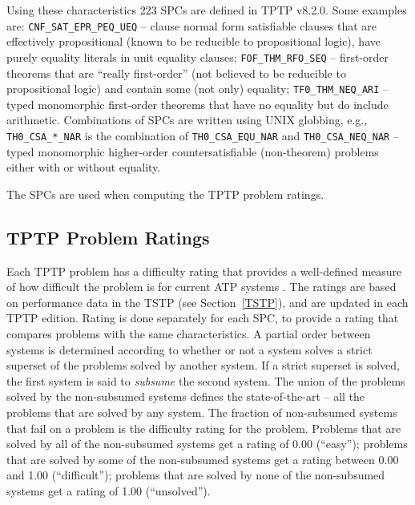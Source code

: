 \documentclass[runningheads]{llncs}
\begin{document}
Using these characteristics 223 SPCs are defined in TPTP v8.2.0.
Some examples are:
{\tt CNF\_SAT\_EPR\_PEQ\_UEQ} -- clause normal form satisfiable clauses that are effectively
propositional (known to be reducible to propositional logic), have purely equality literals
in unit equality clauses;
{\tt FOF\_THM\_RFO\_SEQ} -- first-order theorems that are ``really first-order'' (not believed
to be reducible to propositional logic) and contain some (not only) equality;
{\tt TF0\_THM\_NEQ\_ARI} -- typed monomorphic first-order theorems that have no equality but do
include arithmetic.
Combinations of SPCs are written using UNIX globbing, e.g., {\tt TH0\_CSA\_*\_NAR} is the
combination of {\tt TH0\_CSA\_EQU\_NAR} and {\tt TH0\_CSA\_NEQ\_NAR} -- typed monomorphic 
higher-order countersatisfiable (non-theorem) problems either with or without equality.

The SPCs are used when computing the TPTP problem ratings.

\subsection{TPTP Problem Ratings}
\label{Ratings}

Each TPTP problem has a difficulty rating that provides a well-defined measure of how difficult 
the problem is for current ATP systems \cite{SS01}.
The ratings are based on performance data in the TSTP (see Section~\ref{TSTP}), and are updated
in each TPTP edition.
Rating is done separately for each SPC, to provide a rating that compares problems with the
same characteristics.
A partial order between systems is determined according to whether or not a system solves a strict 
superset of the problems solved by another system. 
If a strict superset is solved, the first system is said to {\em subsume} the second system. 
The union of the problems solved by the non-subsumed systems defines the state-of-the-art -- all 
the problems that are solved by any system. 
The fraction of non-subsumed systems that fail on a problem is the difficulty rating for the 
problem. 
Problems that are solved by all of the non-subsumed systems get a rating of 0.00 (``easy'');
problems that are solved by some of the non-subsumed systems get a rating between 
0.00 and 1.00 (``difficult''); 
problems that are solved by none of the non-subsumed systems get a rating of 1.00 (``unsolved'').

\end{document}
